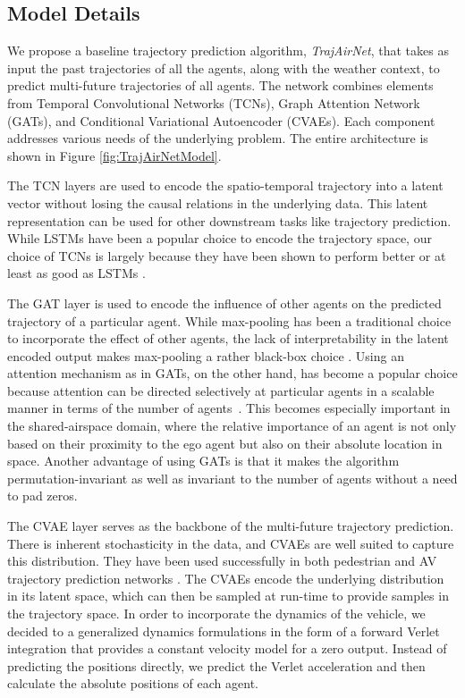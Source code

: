 \documentclass[letterpaper, 10 pt, conference]{ieeeconf}
\begin{document}
   
\subsection{Model Details}\label{sec:model}
We propose a baseline trajectory prediction algorithm, \textit{TrajAirNet}, that takes as input the past trajectories of all the agents, along with the weather context, to predict multi-future trajectories of all agents. The network combines elements from Temporal Convolutional Networks (TCNs), Graph Attention Network (GATs), and Conditional Variational Autoencoder (CVAEs). Each component addresses various needs of the underlying problem. The entire architecture is shown in Figure \ref{fig:TrajAirNetModel}.  

The TCN layers are used to encode the spatio-temporal trajectory into a latent vector without losing the causal relations in the underlying data. This latent representation can be used for other downstream tasks like trajectory prediction. While LSTMs have been a popular choice to encode the trajectory space, our choice of TCNs is largely because they have been shown to perform better or at least as good as LSTMs \cite{bai2018empirical}.

The GAT layer is used to encode the influence of other agents on the predicted trajectory of a particular agent. While max-pooling has been a traditional choice to incorporate the effect of other agents, the lack of interpretability in the latent encoded output makes max-pooling a rather black-box choice \cite{zhao2020noticing}. Using an attention mechanism as in GATs, on the other hand, has become a popular choice because attention can be directed selectively at particular agents in a scalable manner in terms of the number of agents~\cite{vemula2018}. This becomes especially important in the shared-airspace domain, where the relative importance of an agent is not only based on their proximity to the ego agent but also on their absolute location in space. Another advantage of using GATs is that it makes the algorithm permutation-invariant as well as invariant to the number of agents without a need to pad zeros. 

The CVAE layer serves as the backbone of the multi-future trajectory prediction. There is inherent stochasticity in the data, and CVAEs are well suited to capture this distribution. They have been used successfully in both pedestrian and AV trajectory prediction networks \cite{salzmann2020trajectron++}. The CVAEs encode the underlying distribution in its latent space, which can then be sampled at run-time to provide samples in the trajectory space. In order to incorporate the dynamics of the vehicle, we decided to a generalized dynamics formulations in the form of a forward Verlet integration \cite{rhinehart2019precog} that provides a constant velocity model for a zero output. Instead of predicting the positions directly, we predict the Verlet acceleration and then calculate the absolute positions of each agent. 
\end{document}

